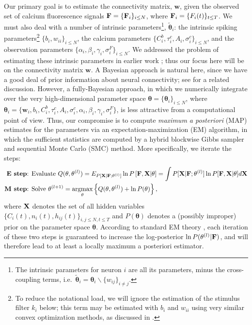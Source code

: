 \documentclass[aoas,preprint]{imsart}
\newcommand{\bth}{\mathbf{\theta}}
\newcommand{\w}{w}
\newcommand{\bw}{\mathbf{\w}}
\DeclareMathOperator*{\argmax}{argmax}
\newcommand{\bF}{{\bf F}}
\newcommand{\bX}{{\bf X}}
\newcommand{\tbth}{\tilde{\bth}}
\begin{document}
Our primary goal is to estimate the connectivity matrix, $\bw$, given
the observed set of calcium fluorescence signals $\bF=\{\bF_i\}_{i\leq
N}$, where $\bF_i=\{F_i(t)\}_{t\leq T}$. We must also deal with a
number of intrinsic parameters\footnote{The intrinsic parameters for
neuron $i$ are all its parameters, minus the cross-coupling terms,
i.e.\ $\tbth_i =\bth_i \backslash \{w_{ij}\}_{i\neq j}$.}, $\tbth_i$:
the intrinsic spiking parameters\footnote{To reduce the notational
load, we will ignore the estimation of the stimulus filter $k_i$
below; this term may be estimated with $b_i$ and $w_{ii}$ using very
similar convex optimization methods, as discussed in
\cite{Vogelstein2009}.}  $\{b_i, w_{ii}\}_{i\leq N}$, the calcium
parameters $\{C^b_i, \tau^c_i, A_i, \sigma^c_i\}_{i\leq N}$, and the
observation parameters $\{\alpha_i, \beta_i, \gamma_i,
\sigma^F_i\}_{i\leq N}$. We addressed the problem of estimating these
intrinsic parameters in earlier work \cite{Vogelstein2009}; thus our
focus here will be on the connectivity matrix $\bw$. A Bayesian
approach is natural here, since we have a good deal of prior
information about neural connectivity; see \cite{Rigat06} for a
related discussion. However, a fully-Bayesian approach, in which we
numerically integrate over the very high-dimensional parameter space
$\bth= \{\bth_i\}_{i\leq N}$, where $\bth_i=\{\bw_i, b_i, C^b_i,
\tau^c_i, A_i, \sigma^c_i, \alpha_i, \beta_i, \gamma_i, \sigma^F_i\}$,
is less attractive from a computational point of view. Thus, our
compromise is to compute \emph{maximum a posteriori} (MAP) estimates
for the parameters via an expectation-maximization (EM) algorithm, in
which the sufficient statistics are computed by a hybrid blockwise
Gibbs sampler and sequential Monte Carlo (SMC) method. More
specifically, we iterate the steps:
\begin{align*}
\textbf{E step} &\text{: Evaluate } Q(\bth,\bth^{(l)}) = E_{P[\bX |
\bF; \bth^{(l)}]} \ln P \left[ \bF, \bX | \bth \right] = \int P[\bX |
\bF; \bth^{(l)}] \ln P[\bF, \bX | \bth] d \bX \\ \textbf{M step}
&\text{: Solve } \bth^{(l+1)} = \argmax_{\bth} \left\{
Q(\bth,\bth^{(l)}) + \ln P(\bth) \right\},
\end{align*}
where $\bX$ denotes the set of all hidden variables $\{ C_i(t), n_i(t), h_{ij}(t) \}_{i,j \leq N, t \leq T}$ and $P(\bth)$ denotes a (possibly improper) prior on the parameter space $\bth$. According to standard EM theory \cite{DLR77,McLachlanKrishnan96}, each iteration of these two steps is guaranteed to increase the log-posterior $\ln P(\bth^{(l)} | \bF)$, and will therefore lead to at least a locally maximum a posteriori estimator.
\end{document}
